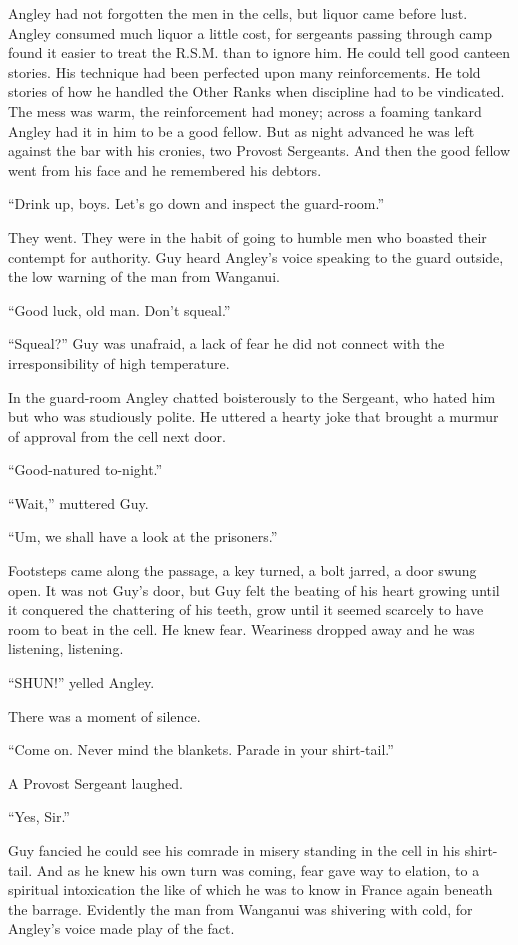 Angley had not forgotten the men in the cells, but liquor came before 
lust. Angley consumed much liquor a little cost, for sergeants passing 
through camp found it easier to treat the R.S.M. than to ignore him. 
He could tell good canteen stories. His technique had been perfected 
upon many reinforcements. He told stories of how he handled the Other 
Ranks when discipline had to be vindicated. The mess was warm, the 
reinforcement had money; across a foaming tankard Angley had it in him 
to be a good fellow. But as night advanced he was left against the 
bar with his cronies, two Provost Sergeants. And then the good fellow 
went from his face and he remembered his debtors.

``Drink up, boys. Let's go down and inspect the guard-room.''

They went. They were in the habit of going to humble men who boasted 
their contempt for authority. Guy heard Angley's voice speaking to the 
guard outside, the low warning of the man from Wanganui.

``Good luck, old man. Don't squeal.''

``Squeal?'' Guy was unafraid, a lack of fear he did not connect with 
the irresponsibility of high temperature.

In the guard-room Angley chatted boisterously to the Sergeant, who 
hated him but who was studiously polite. He uttered a hearty joke that 
brought a murmur of approval from the cell next door.

``Good-natured to-night.''

``Wait,'' muttered Guy.

``Um, we shall have a look at the prisoners.''

Footsteps came along the passage, a key turned, a bolt jarred, a door 
swung open. It was not Guy's door, but Guy felt the beating of his 
heart growing until it conquered the chattering of his teeth, grow 
until it seemed scarcely to have room to beat in the cell. He knew 
fear. Weariness dropped away and he was listening, listening.

``SHUN!'' yelled Angley.

There was a moment of silence.

``Come on. Never mind the blankets. Parade in your shirt-tail.''

A Provost Sergeant laughed.

``Yes, Sir.''

Guy fancied he could see his comrade in misery standing in the cell 
in his shirt-tail. And as he knew his own turn was coming, fear gave 
way to elation, to a spiritual intoxication the like of which he was 
to know in France again beneath the barrage. Evidently the man from 
Wanganui was shivering with cold, for Angley's voice made play of 
the fact.

